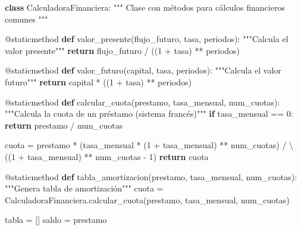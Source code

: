 \documentclass[
  doc,
  floatsintext,
  longtable,
  a4paper,
  nolmodern,
  notxfonts,
  notimes,
  12pt,
  colorlinks=true,linkcolor=blue,citecolor=blue,urlcolor=blue]{apa7}
\newenvironment{Shaded}{\begin{snugshade}}{\end{snugshade}}
\newcommand{\AttributeTok}[1]{\textcolor[rgb]{0.40,0.45,0.13}{#1}}
\newcommand{\CommentTok}[1]{\textcolor[rgb]{0.37,0.37,0.37}{#1}}
\newcommand{\ControlFlowTok}[1]{\textcolor[rgb]{0.00,0.23,0.31}{\textbf{#1}}}
\newcommand{\DecValTok}[1]{\textcolor[rgb]{0.68,0.00,0.00}{#1}}
\newcommand{\KeywordTok}[1]{\textcolor[rgb]{0.00,0.23,0.31}{\textbf{#1}}}
\newcommand{\NormalTok}[1]{\textcolor[rgb]{0.00,0.23,0.31}{#1}}
\newcommand{\OperatorTok}[1]{\textcolor[rgb]{0.37,0.37,0.37}{#1}}
\begin{document}
\begin{Shaded}
\begin{Highlighting}[]
\KeywordTok{class}\NormalTok{ CalculadoraFinanciera:}
    \CommentTok{"""}
\CommentTok{    Clase con métodos para cálculos financieros comunes}
\CommentTok{    """}
    
    \AttributeTok{@staticmethod}
    \KeywordTok{def}\NormalTok{ valor\_presente(flujo\_futuro, tasa, periodos):}
        \CommentTok{"""Calcula el valor presente"""}
        \ControlFlowTok{return}\NormalTok{ flujo\_futuro }\OperatorTok{/}\NormalTok{ ((}\DecValTok{1} \OperatorTok{+}\NormalTok{ tasa) }\OperatorTok{**}\NormalTok{ periodos)}
    
    \AttributeTok{@staticmethod}
    \KeywordTok{def}\NormalTok{ valor\_futuro(capital, tasa, periodos):}
        \CommentTok{"""Calcula el valor futuro"""}
        \ControlFlowTok{return}\NormalTok{ capital }\OperatorTok{*}\NormalTok{ ((}\DecValTok{1} \OperatorTok{+}\NormalTok{ tasa) }\OperatorTok{**}\NormalTok{ periodos)}
    
    \AttributeTok{@staticmethod}
    \KeywordTok{def}\NormalTok{ calcular\_cuota(prestamo, tasa\_mensual, num\_cuotas):}
        \CommentTok{"""Calcula la cuota de un préstamo (sistema francés)"""}
        \ControlFlowTok{if}\NormalTok{ tasa\_mensual }\OperatorTok{==} \DecValTok{0}\NormalTok{:}
            \ControlFlowTok{return}\NormalTok{ prestamo }\OperatorTok{/}\NormalTok{ num\_cuotas}
        
\NormalTok{        cuota }\OperatorTok{=}\NormalTok{ prestamo }\OperatorTok{*}\NormalTok{ (tasa\_mensual }\OperatorTok{*}\NormalTok{ (}\DecValTok{1} \OperatorTok{+}\NormalTok{ tasa\_mensual) }\OperatorTok{**}\NormalTok{ num\_cuotas) }\OperatorTok{/} \OperatorTok{\textbackslash{}}
\NormalTok{                ((}\DecValTok{1} \OperatorTok{+}\NormalTok{ tasa\_mensual) }\OperatorTok{**}\NormalTok{ num\_cuotas }\OperatorTok{{-}} \DecValTok{1}\NormalTok{)}
        \ControlFlowTok{return}\NormalTok{ cuota}
    
    \AttributeTok{@staticmethod}
    \KeywordTok{def}\NormalTok{ tabla\_amortizacion(prestamo, tasa\_mensual, num\_cuotas):}
        \CommentTok{"""Genera tabla de amortización"""}
\NormalTok{        cuota }\OperatorTok{=}\NormalTok{ CalculadoraFinanciera.calcular\_cuota(prestamo, tasa\_mensual, num\_cuotas)}
        
\NormalTok{        tabla }\OperatorTok{=}\NormalTok{ []}
\NormalTok{        saldo }\OperatorTok{=}\NormalTok{ prestamo}
        

\end{Highlighting}
\end{Shaded}
\end{document}
